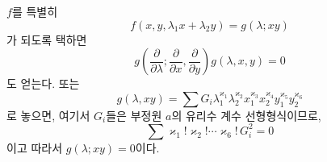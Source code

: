 
$f$를 특별히
\[
  f(x,y,\lambda_1x+\lambda_2y)=g(\lambda;xy)
\]
가 되도록 택하면
\[
  g\left(\frac{\partial}{\partial\lambda};
    \frac{\partial}{\partial x},
    \frac{\partial}{\partial y}\right)g(\lambda,x,y)=0
\]
도 얻는다. 또는
\[
  g(\lambda,xy)=\sum G_i\lambda_1^{\varkappa_1}\lambda_2^{\varkappa_2}
  x_1^{\varkappa_3}x_2^{\varkappa_4}y_1^{\varkappa_5}y_2^{\varkappa_6}
\]
로 놓으면, 여기서 $G_i$들은 부정원 $a$의 유리수 계수 선형형식이므로,
\[
  \sum \varkappa_1!\varkappa_2!\cdots\varkappa_6!\,G_i^2=0
\]
이고 따라서 $g(\lambda;xy)=0$이다.
